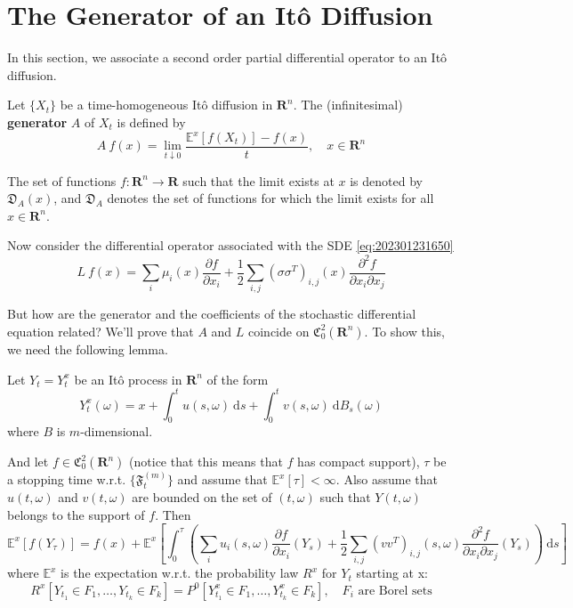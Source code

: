 \section{The Generator of an Itô Diffusion}

In this section, we associate a second order partial differential operator to an Itô diffusion.

\begin{definition}[Generator]
    Let $\{ X_t \}$ be a time-homogeneous Itô diffusion in $\textbf{R}^n$. The (infinitesimal) \textbf{generator} $A$ of $X_t$ is defined by 
    \begin{equation}\label{eq:202301231654}
        A~f(x) = \lim_{t \downarrow 0} \frac{\mathbb{E}^x [ f(X_t)] - f(x)}{t}, \quad x \in \textbf{R}^n
    \end{equation}

    The set of functions $f : \textbf{R}^n \longrightarrow \textbf{R}$ such that the limit exists at $x$ is denoted by $\mathfrak{D}_A(x)$, and $\mathfrak{D}_A$ denotes the set of functions for which the limit exists for all $x \in \textbf{R}^n$.
\end{definition}

Now consider the differential operator associated with the SDE \eqref{eq:202301231650}
\begin{equation*}
    L~f(x) = \sum_i \mu_i(x) \frac{\partial f}{\partial x_i} + \frac{1}{2} \sum_{i, j} (\sigma \sigma^T)_{i,j}(x) \frac{\partial^2 f}{\partial x_i \partial x_j}
\end{equation*}

But how are the generator and the coefficients of the stochastic differential equation related? We'll prove that $A$ and $L$ coincide on $\mathfrak{C}_0^2(\textbf{R}^n)$. To show this, we need the following lemma.

\begin{lemma}\label{lm:202301241653}
    Let $Y_t = Y_t^x$ be an Itô process in $\textbf{R}^n$ of the form 
    \[
        Y_t^x(\omega) = x + \int_0^t u(s,\omega) ~\mathrm{d}s + \int_0^t v(s,\omega) ~\mathrm{d}B_s(\omega)
    \]
    where $B$ is $m$-dimensional.

    And let $f \in \mathfrak{C}_0^2(\textbf{R}^n)$ (notice that this means that $f$ has compact support), $\tau$ be a stopping time w.r.t. $\{ \mathfrak{F}_t^{(m)} \}$ and assume that $\mathbb{E}^x[\tau] < \infty$. Also assume that $u(t, \omega)$ and $v(t, \omega)$ are bounded on the set of $(t, \omega)$ such that $Y(t, \omega)$ belongs to the support of $f$. Then 
    \[
        \mathbb{E}^x[f(Y_\tau)] = f(x) + \mathbb{E}^x\left[ \int_0^\tau \left( \sum_i u_i(s, \omega) \frac{\partial f}{\partial x_i}(Y_s) + \frac{1}{2} \sum_{i,j}(vv^T)_{i,j}(s, \omega) \frac{\partial^2 f}{\partial x_i \partial x_j}(Y_s) \right) ~\mathrm{d}s \right]
    \]
    where $\mathbb{E}^x$ is the expectation w.r.t. the probability law $R^x$ for $Y_t$ starting at x: 
    \[
        R^x[Y_{t_1} \in F_1, \ldots, Y_{t_k} \in F_k] = P^0[Y_{t_1}^x \in F_1, \ldots, Y_{t_k}^x \in F_k], \quad F_i \text{ are Borel sets}
    \]
\end{lemma}

